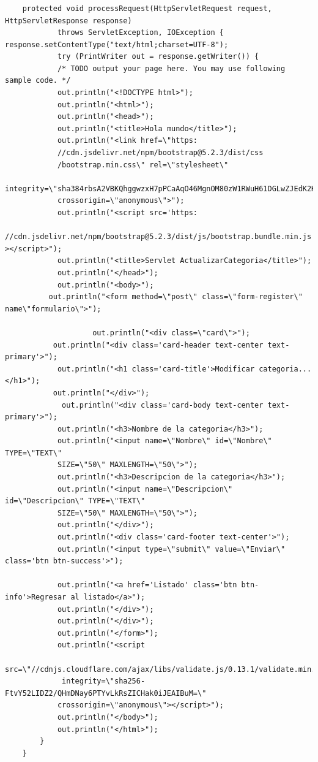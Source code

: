 \documentclass[10pt,a4paper]{article}
\begin{document}
\subsubsection{\color{colorGENERICO}{Actualizar}}
\begin{lstlisting}
    protected void processRequest(HttpServletRequest request, HttpServletResponse response)
            throws ServletException, IOException {
response.setContentType("text/html;charset=UTF-8");
            try (PrintWriter out = response.getWriter()) {
            /* TODO output your page here. You may use following sample code. */
            out.println("<!DOCTYPE html>");
            out.println("<html>");
            out.println("<head>");
            out.println("<title>Hola mundo</title>");            
            out.println("<link href=\"https:
            //cdn.jsdelivr.net/npm/bootstrap@5.2.3/dist/css            
            /bootstrap.min.css\" rel=\"stylesheet\" 
            integrity=\"sha384rbsA2VBKQhggwzxH7pPCaAqO46MgnOM80zW1RWuH61DGLwZJEdK2Kadq2F9CUG65\" 
            crossorigin=\"anonymous\">");
            out.println("<script src='https:
            //cdn.jsdelivr.net/npm/bootstrap@5.2.3/dist/js/bootstrap.bundle.min.js' ></script>");
            out.println("<title>Servlet ActualizarCategoria</title>");            
            out.println("</head>");
            out.println("<body>");
          out.println("<form method=\"post\" class=\"form-register\" name\"formulario\">");
          
                    out.println("<div class=\"card\">");
           out.println("<div class='card-header text-center text-primary'>");
            out.println("<h1 class='card-title'>Modificar categoria...</h1>");
           out.println("</div>");
             out.println("<div class='card-body text-center text-primary'>");
            out.println("<h3>Nombre de la categoria</h3>");
            out.println("<input name=\"Nombre\" id=\"Nombre\" TYPE=\"TEXT\" 
            SIZE=\"50\" MAXLENGTH=\"50\">");
            out.println("<h3>Descripcion de la categoria</h3>");
            out.println("<input name=\"Descripcion\" id=\"Descripcion\" TYPE=\"TEXT\" 
            SIZE=\"50\" MAXLENGTH=\"50\">");
            out.println("</div>");          
            out.println("<div class='card-footer text-center'>");
            out.println("<input type=\"submit\" value=\"Enviar\" class='btn btn-success'>");
            
            out.println("<a href='Listado' class='btn btn-info'>Regresar al listado</a>");
            out.println("</div>");
            out.println("</div>");
            out.println("</form>");
            out.println("<script
             src=\"//cdnjs.cloudflare.com/ajax/libs/validate.js/0.13.1/validate.min.js\" 
             integrity=\"sha256-FtvY52LIDZ2/QHmDNay6PTYvLkRsZICHak0iJEAIBuM=\" 
            crossorigin=\"anonymous\"></script>");
            out.println("</body>");
            out.println("</html>");
        }
    }
    

\end{lstlisting}
\end{document}
